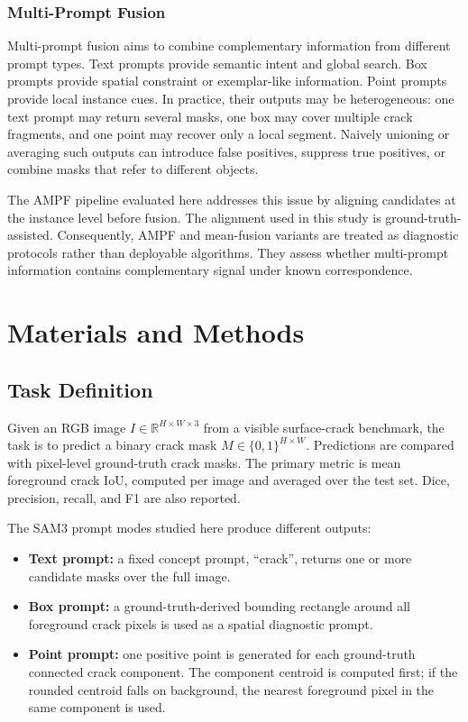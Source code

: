 \documentclass[applsci,article,submit,pdftex,moreauthors]{Definitions/mdpi}
\begin{document}
\subsubsection{Multi-Prompt Fusion}

Multi-prompt fusion aims to combine complementary information from
different prompt types. Text prompts provide semantic intent and global
search. Box prompts provide spatial constraint or exemplar-like
information. Point prompts provide local instance cues. In practice,
their outputs may be heterogeneous: one text prompt may return several
masks, one box may cover multiple crack fragments, and one point may
recover only a local segment. Naively unioning or averaging such outputs
can introduce false positives, suppress true positives, or combine masks
that refer to different objects.

The AMPF pipeline evaluated here addresses this issue by aligning
candidates at the instance level before fusion. The alignment used in
this study is ground-truth-assisted. Consequently, AMPF and mean-fusion
variants are treated as diagnostic protocols rather than deployable
algorithms. They assess whether multi-prompt information contains
complementary signal under known correspondence.

\section{Materials and Methods}

\subsection{Task Definition}

Given an RGB image \(I \in \mathbb{R}^{H \times W \times 3}\) from a
visible surface-crack benchmark, the task is to predict a binary crack
mask \(M \in \{0,1\}^{H \times W}\). Predictions are compared with
pixel-level ground-truth crack masks. The primary metric is mean
foreground crack IoU, computed per image and averaged over the test set.
Dice, precision, recall, and F1 are also reported.

The SAM3 prompt modes studied here produce different outputs:

\begin{itemize}
\item
  \textbf{Text prompt:} a fixed concept prompt, ``crack'', returns one
  or more candidate masks over the full image.
\item
  \textbf{Box prompt:} a ground-truth-derived bounding rectangle around
  all foreground crack pixels is used as a spatial diagnostic prompt.
\item
  \textbf{Point prompt:} one positive point is generated for each
  ground-truth connected crack component. The component centroid is
  computed first; if the rounded centroid falls on background, the
  nearest foreground pixel in the same component is used.
\end{itemize}
\end{document}
